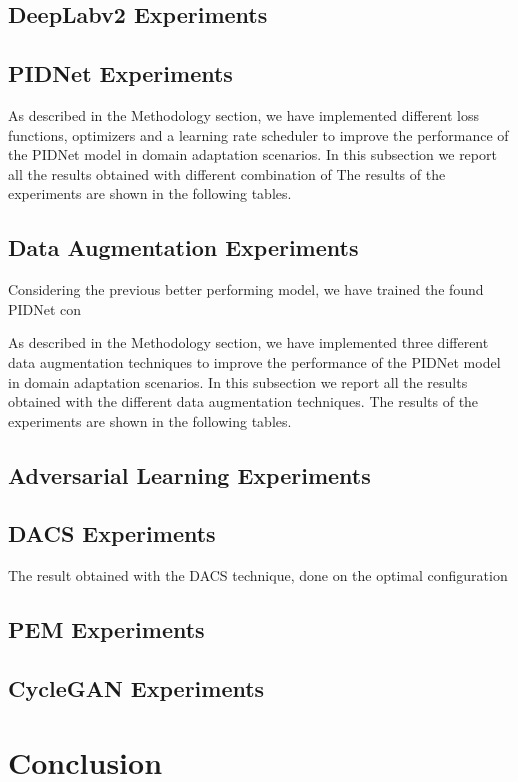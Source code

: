 \documentclass[10pt,twocolumn,letterpaper]{article}
\begin{document}
\subsection{DeepLabv2 Experiments}

\subsection{PIDNet Experiments}

As described in the Methodology section, we have implemented different loss functions, optimizers and a learning rate scheduler to improve the performance of the PIDNet model in domain adaptation scenarios. In this subsection we report all the results obtained with different combination of The results of the experiments are shown in the following tables.



\subsection{Data Augmentation Experiments}

Considering the previous better performing model, we have trained the found PIDNet con

As described in the Methodology section, we have implemented three different data augmentation techniques to improve the performance of the PIDNet model in domain adaptation scenarios. In this subsection we report all the results obtained with the different data augmentation techniques. The results of the experiments are shown in the following tables.

\subsection{Adversarial Learning Experiments}

\subsection{DACS Experiments}

The result obtained with the DACS technique, done on the optimal configuration 

\subsection{PEM Experiments}

\subsection{CycleGAN Experiments}

\section{Conclusion}



\end{document}
